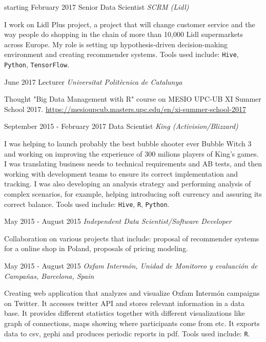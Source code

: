 \documentclass{article}
\begin{document}
\begin{CV}

\item[starting February 2017] {Senior Data Scientist \it SCRM (Lidl)}

  I work on Lidl Plus project, a project that will change customer
  service and the way people do shopping in the chain of more than
  10,000 Lidl supermarkets across Europe. My role is setting up
  hypothesis-driven decision-making environment and creating
  recommender systems. Tools used include:
  \texttt{Hive}, \texttt{Python}, \texttt{TensorFlow}.

\item[June 2017] {Lecturer \it Universitat Politècnica de Catalunya}

  Thought "Big Data Management with R" course on MESIO UPC-UB XI
  Summer School
  2017. \href{https://mesioupcub.masters.upc.edu/en/xi-summer-school-2017}{https://mesioupcub.masters.upc.edu/en/xi-summer-school-2017}

     
\item[September 2015 - February 2017] {Data Scientist \it King (Activision/Blizzard)}

  I was helping to launch probably the best bubble shooter ever Bubble
  Witch 3 and working on improving the experience of 300 milions
  players of King's games. I was translating business needs to
  technical requirements and AB tests, and then working with
  development teams to ensure its correct implementation and tracking.
  I was also developing an analysis strategy and performing analysis
  of complex scenarios, for example, helping introducing soft currency
  and assuring its correct balance.  Tools used include:
  \texttt{Hive}, \texttt{R}, \texttt{Python}.
  
\item[May 2015 - August 2015] {\it Independent Data Scientist/Software Developer}

  Collaboration on various projects that include: proposal of
  recommender systems for a online shop in Poland, proposals of
  pricing modeling.

\item[May 2015 - August 2015] {\it Oxfam Intermón, Unidad de
    Monitoreo y evaluación de Campañas, Barcelona, Spain}

  Creating web application that analyzes and visualize Oxfam Intermón
  campaigns on Twitter. It accesses twitter API and stores relevant
  information in a data base. It provides different
  statistics together with different
  visualizations like graph of connections, maps showing
  where participants come from etc. It exports data to csv, gephi and
  produces periodic reports in pdf.  Tools used
  include: \texttt{R}.
  

\end{CV}
\end{document}
